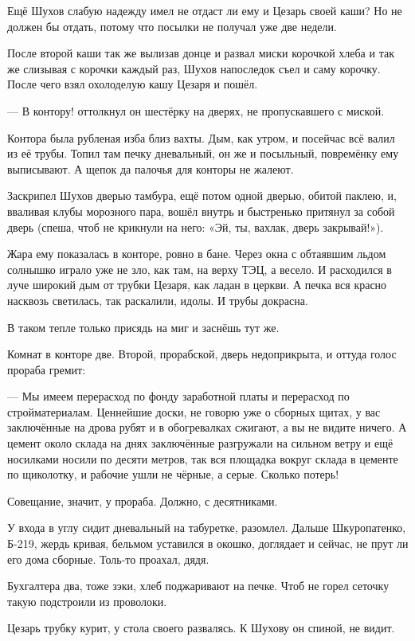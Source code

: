 Ещё Шухов слабую надежду имел \dash не отдаст ли ему и Цезарь своей каши? Но не должен бы отдать,
потому что посылки не получал уже две недели.

После второй каши так же вылизав донце и развал миски корочкой хлеба и так же слизывая с
корочки каждый раз, Шухов напоследок съел и саму корочку. После чего взял охолоделую кашу
Цезаря и пошёл.

--- В контору! \dash оттолкнул он шестёрку на дверях, не пропускавшего с миской.

Контора была \dash рубленая изба близ вахты. Дым, как утром, и посейчас всё валил из её трубы.
Топил там печку дневальный, он же и посыльный, повремёнку ему выписывают. А щепок да палочья
для конторы не жалеют.

Заскрипел Шухов дверью тамбура, ещё потом одной дверью, обитой паклею, и, вваливая клубы
морозного пара, вошёл внутрь и быстренько притянул за собой дверь (спеша, чтоб не крикнули на
него: «Эй, ты, вахлак, дверь закрывай!»).

Жара ему показалась в конторе, ровно в бане. Через окна с обтаявшим льдом солнышко играло уже
не зло, как там, на верху ТЭЦ, а весело. И расходился в луче широкий дым от трубки Цезаря, как
ладан в церкви. А печка вся красно насквозь светилась, так раскалили, идолы. И трубы докрасна.

В таком тепле только присядь на миг \dash и заснёшь тут же.

Комнат в конторе две. Второй, прорабской, дверь недоприкрыта, и оттуда голос прораба гремит:

--- Мы имеем перерасход по фонду заработной платы и перерасход по стройматериалам. Ценнейшие
доски, не говорю уже о сборных щитах, у вас заключённые на дрова рубят и в обогревалках
сжигают, а вы не видите ничего. А цемент около склада на днях заключённые разгружали на
сильном ветру и ещё носилками носили по десяти метров, так вся площадка вокруг склада в
цементе по щиколотку, и рабочие ушли не чёрные, а серые. Сколько потерь!

Совещание, значит, у прораба. Должно, с десятниками.

У входа в углу сидит дневальный на табуретке, разомлел. Дальше Шкуропатенко, Б-219, жердь
кривая, бельмом уставился в окошко, доглядает и сейчас, не прут ли его дома сборные. Толь-то
проахал, дядя.

Бухгалтера два, тоже зэки, хлеб поджаривают на печке. Чтоб не горел \dash сеточку такую
подстроили из проволоки.

Цезарь трубку курит, у стола своего развалясь. К Шухову он спиной, не видит.

